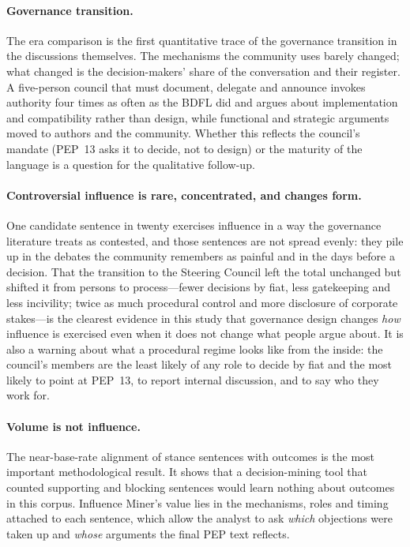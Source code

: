 \documentclass[sigconf,screen]{acmart}
\begin{document}
\paragraph{Governance transition.} The era comparison is the first quantitative trace of the governance transition in the discussions themselves. The mechanisms the community uses barely changed; what changed is the decision-makers' share of the conversation and their register. A five-person council that must document, delegate and announce invokes authority four times as often as the BDFL did and argues about implementation and compatibility rather than design, while functional and strategic arguments moved to authors and the community. Whether this reflects the council's mandate (PEP~13 asks it to decide, not to design) or the maturity of the language is a question for the qualitative follow-up.

\paragraph{Controversial influence is rare, concentrated, and changes form.} One candidate sentence in twenty exercises influence in a way the governance literature treats as contested, and those sentences are not spread evenly: they pile up in the debates the community remembers as painful and in the days before a decision. That the transition to the Steering Council left the total unchanged but shifted it from persons to process---fewer decisions by fiat, less gatekeeping and less incivility; twice as much procedural control and more disclosure of corporate stakes---is the clearest evidence in this study that governance design changes \emph{how} influence is exercised even when it does not change what people argue about. It is also a warning about what a procedural regime looks like from the inside: the council's members are the least likely of any role to decide by fiat and the most likely to point at PEP~13, to report internal discussion, and to say who they work for.

\paragraph{Volume is not influence.} The near-base-rate alignment of stance sentences with outcomes is the most important methodological result. It shows that a decision-mining tool that counted supporting and blocking sentences would learn nothing about outcomes in this corpus. Influence Miner's value lies in the mechanisms, roles and timing attached to each sentence, which allow the analyst to ask \emph{which} objections were taken up and \emph{whose} arguments the final PEP text reflects.
\end{document}
